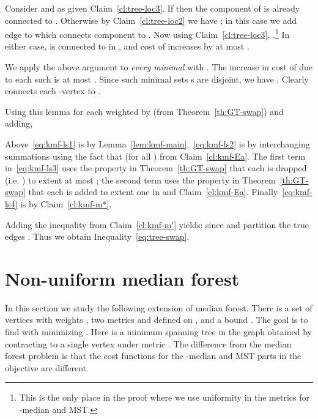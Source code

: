 \documentclass[11pt,twoside,a4paper]{article}
\newenvironment{proof}{

\noindent{\bf Proof:}} {\hfill


}
\def\kmf{ median forest\xspace}
\begin{document}
\begin{proof}
Consider  and  as given Claim~\ref{cl:tree-loc3}. If  then the component  of
 is already connected to . Otherwise by Claim~\ref{cl:tree-loc2} we have ; in this
case we add edge  to  which connects component  to . Now using Claim~\ref{cl:tree-loc3}, .\footnote{This is the only place in the proof where we use uniformity in the metrics for -median and MST.}
In either case,  is connected to  in , and cost of  increases by at most .

We apply the above argument to {\em every minimal}  with .
The increase in cost of  due to each such  is at most . Since such minimal sets s are
disjoint, we have . Clearly  connects each -vertex to .
\end{proof}
\medskip

Using this lemma for each  weighted by  (from Theorem~\ref{th:GT-swap}) and adding,

Above~\eqref{eq:kmf-ls1} is by Lemma~\ref{lem:kmf-main},~\eqref{eq:kmf-ls2} is by interchanging summations using the
fact that  (for all ) from Claim~\ref{cl:kmf-Ea}. The first term in~\eqref{eq:kmf-ls3} uses
the property in Theorem~\ref{th:GT-swap} that each  is dropped (i.e. ) to extent at most ;
the second term uses the property in Theorem~\ref{th:GT-swap} that each  is added to extent one in \swap
and Claim~\ref{cl:kmf-Ea}. Finally~\eqref{eq:kmf-ls4} is by Claim~\ref{cl:kmf-m*}.


Adding the inequality  from Claim~\ref{cl:kmf-m'} yields:
 since  and  partition the true edges . Thus we obtain
Inequality~\eqref{eq:tree-swap}.















\section{Non-uniform  median forest}\label{sec:non-unif-kmf}
In this section we study the following extension of  median forest. There is a set of vertices  with weights
, two metrics  and  defined on , and a bound . The goal is to find  with 
minimizing . Here  is a minimum
spanning tree in the graph obtained by contracting  to a single vertex under metric . The difference from the
\kmf problem is that the cost functions for the -median and MST parts in the objective are different.
\end{document}

